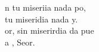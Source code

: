 \begin{cancion}%
	n tu miseriia nada po, \\
	 tu miseridia nada y.\\
	or, sin  miserirdia da pue \\
	a , Seor.\\
\end{cancion}%
